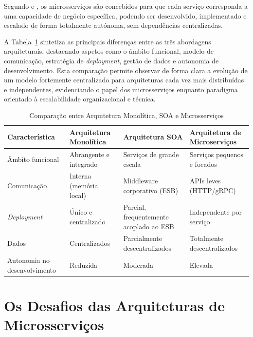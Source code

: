 Segundo \cite{Newman2015} e \cite{Dragoni2017}, os microsserviços são concebidos para que cada serviço corresponda a uma capacidade de negócio específica, podendo ser desenvolvido, implementado e escalado de forma totalmente autónoma, sem dependências centralizadas.

A Tabela~\ref{tab:comparacao_arq} sintetiza as principais diferenças entre as três abordagens arquiteturais, destacando aspetos como o âmbito funcional, modelo de comunicação, estratégia de \textit{deployment}, gestão de dados e autonomia de desenvolvimento. Esta comparação permite observar de forma clara a evolução de um modelo fortemente centralizado para arquiteturas cada vez mais distribuídas e independentes, evidenciando o papel dos microsserviços enquanto paradigma orientado à escalabilidade organizacional e técnica.

\begin{table}[h]
\centering
\caption{Comparação entre Arquitetura Monolítica, SOA e Microsserviços}
\label{tab:comparacao_arq}
\begin{tabular}{|p{3.3cm}|p{3.3cm}|p{3.3cm}|p{3.3cm}|}
\hline
\textbf{Característica} & \textbf{Arquitetura Monolítica} & \textbf{Arquitetura SOA} & \textbf{Arquitetura de Microserviços} \\ \hline

Âmbito funcional & Abrangente e integrado & Serviços de grande escala & Serviços pequenos e focados \\ \hline

Comunicação & Interna (memória local) & Middleware corporativo (ESB) & APIs leves (HTTP/gRPC) \\ \hline

\textit{Deployment} & Único e centralizado & Parcial, frequentemente acoplado ao ESB & Independente por serviço \\ \hline

Dados & Centralizados & Parcialmente descentralizados & Totalmente descentralizados \\ \hline

Autonomia no desenvolvimento & Reduzida & Moderada & Elevada \\ \hline
\end{tabular}
\end{table}


\section{Os Desafios das Arquiteturas de Microsserviços}

